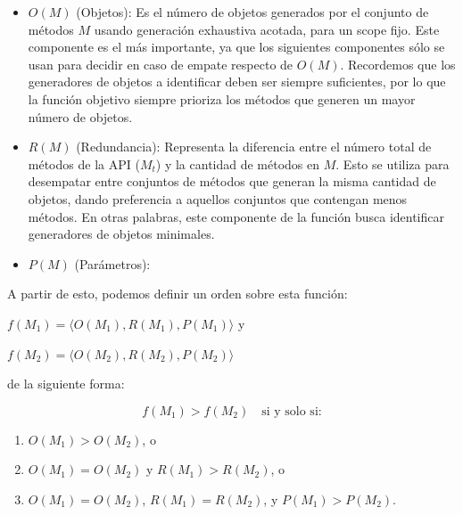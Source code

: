 \begin{itemize}
    \item $O(M)$ (Objetos): Es el número de objetos generados por el conjunto de métodos $M$ usando generación exhaustiva acotada, para un scope fijo. Este componente es el más importante, ya que los siguientes componentes sólo se usan para decidir en caso de empate respecto de $O(M)$. Recordemos que los generadores de objetos a identificar deben ser siempre suficientes, por lo que la función objetivo siempre prioriza los métodos que generen un mayor número de objetos.
    \item $R(M)$ (Redundancia): Representa la diferencia entre el número total de métodos de la API ($M_t$) y la cantidad de métodos en $M$. Esto se utiliza para desempatar entre conjuntos de métodos que generan la misma cantidad de objetos, dando preferencia a aquellos conjuntos que contengan menos métodos. En otras palabras, este componente de la función busca identificar generadores de objetos minimales.
    \item $P(M)$ (Parámetros): 
\end{itemize}


A partir de esto, podemos definir un orden sobre esta función: 

\( f(M_1) = \langle O(M_1), R(M_1), P(M_1) \rangle \) y

\( f(M_2) = \langle O(M_2), R(M_2), P(M_2) \rangle \) 
\vspace{5pt} 

de la siguiente forma:

\[
f(M_1) > f(M_2) \quad \text{si y solo si:}
\]

\begin{enumerate}
    \item \( O(M_1) > O(M_2) \), o
    \item \( O(M_1) = O(M_2) \) y \( R(M_1) > R(M_2) \), o
    \item \( O(M_1) = O(M_2) \), \( R(M_1) = R(M_2) \), y \( P(M_1) > P(M_2) \).
\end{enumerate}

